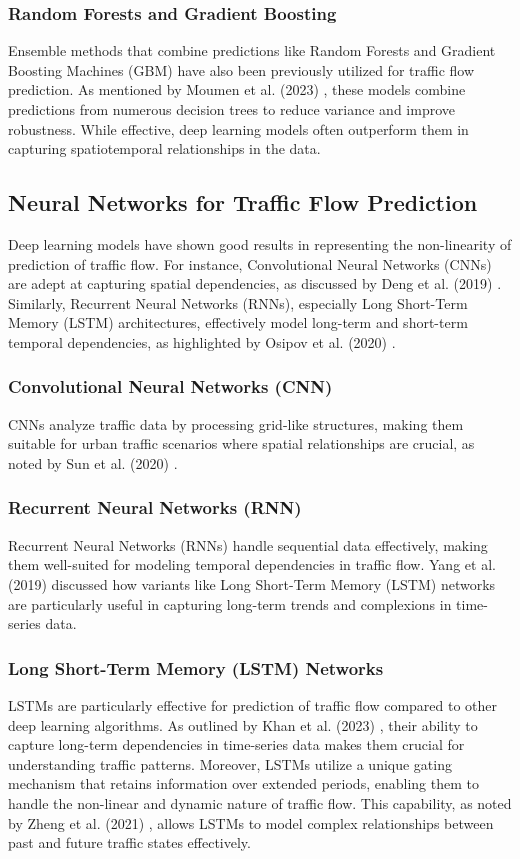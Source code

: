 \documentclass[conference]{IEEEtran}
\begin{document}
\subsubsection{Random Forests and Gradient Boosting}
Ensemble methods that combine predictions like Random Forests and Gradient Boosting Machines (GBM) have also been previously utilized for traffic flow prediction. As mentioned by Moumen et al. (2023) \cite{ppr5}, these models combine predictions from numerous decision trees to reduce variance and improve robustness. While effective, deep learning models often outperform them in capturing spatiotemporal relationships in the data.

\subsection{Neural Networks for Traffic Flow Prediction}

Deep learning models have shown good results in representing the non-linearity of prediction of traffic flow. For instance, Convolutional Neural Networks (CNNs) are adept at capturing spatial dependencies, as discussed by Deng et al. (2019) \cite{ppr6}. Similarly, Recurrent Neural Networks (RNNs), especially Long Short-Term Memory (LSTM) architectures, effectively model long-term and short-term temporal dependencies, as highlighted by Osipov et al. (2020) \cite{ppr8}.

\subsubsection{Convolutional Neural Networks (CNN)}
CNNs analyze traffic data by processing grid-like structures, making them suitable for urban traffic scenarios where spatial relationships are crucial, as noted by Sun et al. (2020) \cite{ppr7}.

\subsubsection{Recurrent Neural Networks (RNN)}
Recurrent Neural Networks (RNNs) handle sequential data effectively, making them well-suited for modeling temporal dependencies in traffic flow. Yang et al. (2019) \cite{ppr9} discussed how variants like Long Short-Term Memory (LSTM) networks are particularly useful in capturing long-term trends and complexions in time-series data.

\subsubsection{Long Short-Term Memory (LSTM) Networks}
LSTMs are particularly effective for prediction of traffic flow compared to other deep learning algorithms. As outlined by Khan et al. (2023) \cite{ppr12}, their ability to capture long-term dependencies in time-series data makes them crucial for understanding traffic patterns. Moreover, LSTMs utilize a unique gating mechanism that retains information over extended periods, enabling them to handle the non-linear and dynamic nature of traffic flow. This capability, as noted by Zheng et al. (2021) \cite{ppr14}, allows LSTMs to model complex relationships between past and future traffic states effectively.
\end{document}

